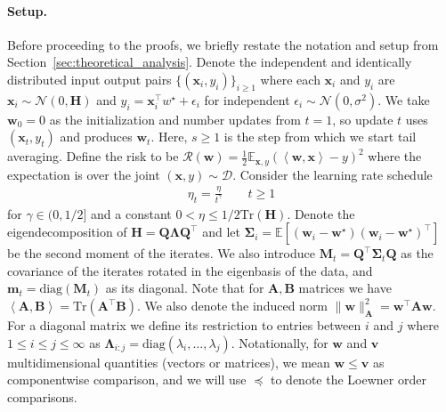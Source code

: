 \documentclass{article}
\def\la{\langle

}
\def\ra{\rangle}
\def\v{{\mathbf{v}}}
\def\x{{\mathbf{x}}}
\def\w{{\mathbf{w}}}
\def\m{{\mathbf{m}}}
\def\H{{\mathbf{H}}}
\def\M{{\mathbf{M}}}
\def\Q{{\mathbf{Q}}}
\def\H{{\mathbf{H}}}
\def\risk{\mathcal{R}}
\def\diag{\text{diag}}
\def\LLambda{{\mathbf{\Lambda}}}
\def\SSigma{\mathbf{\Sigma}}
\def\N{\mathcal{N}}
\def\tr{\text{Tr}}
\def\ra{{\textnormal{a}}}
\newcommand{\E}{\mathbb{E}}
\def\la{\langle}
\def\ra{\rangle}
\def\v{{\mathbf{v}}}
\def\x{{\mathbf{x}}}
\def\w{{\mathbf{w}}}
\def\m{{\mathbf{m}}}
\def\H{{\mathbf{H}}}
\def\M{{\mathbf{M}}}
\def\Q{{\mathbf{Q}}}
\def\H{{\mathbf{H}}}
\def\risk{\mathcal{R}}
\def\LLambda{{\mathbf{\Lambda}}}
\def\SSigma{\mathbf{\Sigma}}
\def\N{\mathcal{N}}
\def\tr{\text{Tr}}
\theoremstyle{plain}
\def\la{\left\langle}
\def\ra{\right\rangle}
\def\x{{\mathbf{x}}}
\def\w{{\mathbf{w}}}
\def\m{{\mathbf{m}}}
\def\H{{\mathbf{H}}}
\def\Q{{\mathbf{Q}}}
\def\M{{\mathbf{M}}}
\def\diag{{\text{diag}}}
\def\risk{\mathcal{R}}
\def\E{\mathbb{E}}
\def\LLambda{{\mathbf{\Lambda}}}
\def\SSigma{\mathbf{\Sigma}}
\def\N{\mathcal{N}}
\begin{document}
\paragraph{Setup.} Before proceeding to the proofs, we briefly restate the notation and setup from Section~\ref{sec:theoretical_analysis}. Denote the independent and identically distributed input output pairs $\{(\x_i, y_i)\}_{i \geq 1}$ where each $\x_i$ and $y_i$ are $\x_i \sim \N(0, \H)$ and $y_i = \x_i^\top w^\star + \epsilon_i$ for independent $\epsilon_i \sim \N(0, \sigma^2)$. We take $\w_0=0$ as the initialization and number updates from $t=1$, so update $t$ uses $(\x_t,y_t)$ and produces $\w_t$. Here, $s\geq1$ is the step from which we start tail averaging. Define the risk to be $\risk(\w) = \frac{1}{2} \E_{\x, y} (\la \w, \x \ra - y)^2$ where the expectation is over the joint $(\x, y) \sim \mathcal{D}$. Consider the learning rate schedule
\begin{align*}
    \eta_t = \frac{\eta}{t^\gamma} \qquad t \geq 1
\end{align*}
for $\gamma \in (0, 1/2]$ and a constant $0 < \eta \leq 1/{2\tr(\H)}$. Denote the eigendecomposition of $\H = \Q \LLambda \Q^\top$ and let $\SSigma_i = \E [(\w_i - \w^\star)(\w_i - \w^\star)^\top]$ be the second moment of the iterates. We also introduce $\M_t = \Q^\top \SSigma_t \Q$ as the covariance of the iterates rotated in the eigenbasis of the data, and $\m_t = \diag(\M_t)$ as its diagonal. Note that for $\mathbf{A}, \mathbf{B}$ matrices we have $\la \mathbf{A}, \mathbf{B} \ra = \tr(\mathbf{A}^\top \mathbf{B})$. We also denote the induced norm $\|\w\|_{\mathbf{A}}^2 = \w^\top \mathbf{A}\w$. For a diagonal matrix we define its restriction to entries between $i$ and $j$ where $1 \leq i \leq j \leq \infty$ as $\LLambda_{i:j} = \diag(\lambda_i, \dots, \lambda_j)$. Notationally, for $\w$ and $\v$ multidimensional quantities (vectors or matrices), we mean $\w \leq \v$ as componentwise comparison, and we will use $\preceq$ to denote the Loewner order comparisons.
\end{document}
